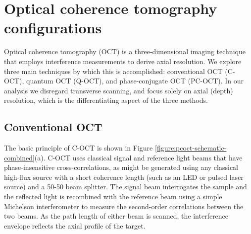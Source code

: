\section{Optical coherence tomography configurations}

Optical coherence tomography (OCT) is a three-dimensional imaging technique that employs interference measurements to derive axial resolution. We explore three main techniques by which this is accomplished: conventional OCT (C-OCT), quantum OCT (Q-OCT), and phase-conjugate OCT (PC-OCT). In our analysis we disregard transverse scanning, and focus solely on axial (depth) resolution, which is the differentiating aspect of the three methods.

\subsection{Conventional OCT}

The basic principle of C-OCT is shown in Figure \ref{figure:pcoct-schematic-combined}(a). C-OCT uses classical signal and reference light beams that have phase-insensitive cross-correlations, as might be generated using any classical high-flux source with a short coherence length (such as an LED or pulsed laser source) and a 50-50 beam splitter. The signal beam interrogates the sample and the reflected light is recombined with the reference beam using a simple Michelson interferometer to measure the second-order correlations between the two beams. As the path length of either beam is scanned, the interference envelope reflects the axial profile of the target.


